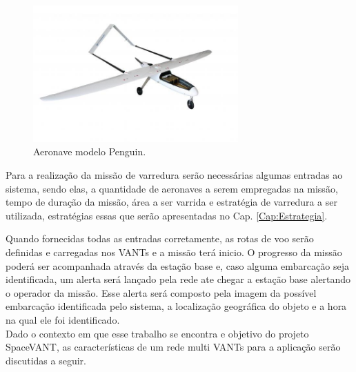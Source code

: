 \begin{figure} 
\center
\includegraphics[width=0.7\textwidth]{penguin.jpg}
\caption{Aeronave modelo Penguin.} 
\label{fig:penguin}
\end{figure}

Para a realização da missão de varredura serão necessárias algumas entradas ao sistema, sendo elas, a quantidade de aeronaves a serem empregadas na missão, tempo de duração da missão, área a ser varrida e estratégia de varredura a ser utilizada, estratégias essas que serão apresentadas no Cap. \ref{Cap:Estrategia}.

Quando fornecidas todas as entradas corretamente, as rotas de voo serão definidas e carregadas nos VANTs e a missão terá inicio. O progresso da missão poderá ser acompanhada através da estação base e, caso alguma embarcação seja identificada, um alerta será lançado pela rede ate chegar a estação base alertando o operador da missão. Esse alerta será composto pela imagem da possível embarcação identificada pelo sistema, a localização geográfica do objeto e a hora na qual ele foi identificado.\\  

Dado o contexto em que esse trabalho se encontra e objetivo do projeto SpaceVANT, as características de um rede multi VANTs para a aplicação serão discutidas a seguir.





 